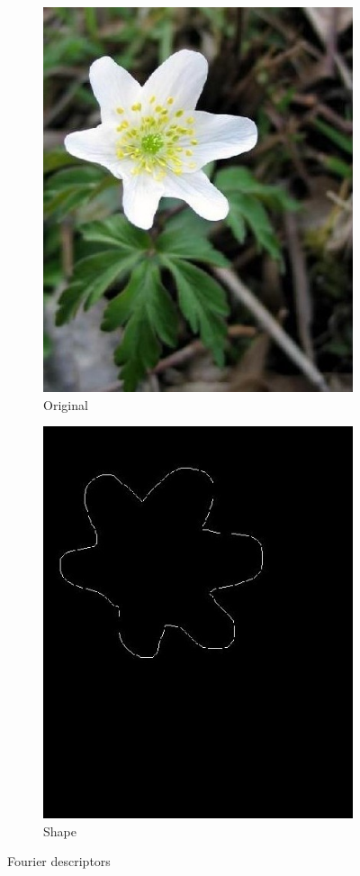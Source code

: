 \documentclass[11]{article}
\begin{document}
\begin{figure}[H]
    \begin{subfigure}[t]{0.45\textwidth}
    \centering
  \includegraphics[scale=0.25]{images/originalfourier.jpg}
    \caption{Original}
    \label{originalfourier}
    \end{subfigure}
    \begin{subfigure}[t]{0.45\textwidth}
    \centering
    \includegraphics[scale=0.25]{images/shape.jpg}
    \caption{Shape}
    \label{fourier2}
    \end{subfigure}
    \label{fourier}
    \caption{Fourier descriptors}
\end{figure}
\end{document}
